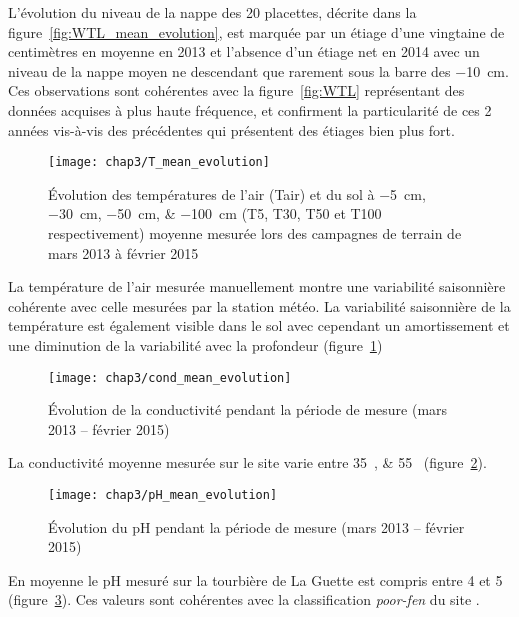 L'évolution du niveau de la nappe des 20 placettes, décrite dans la figure~\ref{fig:WTL_mean_evolution}, est marquée par un étiage d'une vingtaine de centimètres en moyenne en 2013 et l'absence d'un étiage net en 2014 avec un niveau de la nappe moyen ne descendant que rarement sous la barre des \SI{-10}{\cm}.
Ces observations sont cohérentes avec la figure~\ref{fig:WTL} représentant des données acquises à plus haute fréquence, et confirment la particularité de ces 2 années vis-à-vis des précédentes qui présentent des étiages bien plus fort.

\begin{figure}
\centering
\texttt{[image: chap3/T\_mean\_evolution]}
\caption{Évolution des températures de l'air (Tair) et du sol à \SIlist{-5;-30;-50;-100}{\centi\metre} (T5, T30, T50 et T100 respectivement) moyenne mesurée lors des campagnes de terrain de mars 2013 à février 2015}
\label{fig:T_mean_evolution}
\end{figure}

La température de l'air mesurée manuellement montre une variabilité saisonnière cohérente avec celle mesurées par la station météo. 
La variabilité saisonnière de la température est également visible dans le sol avec cependant un amortissement et une diminution de la variabilité avec la profondeur (figure~\ref{fig:T_mean_evolution})

\begin{figure}
\centering
\texttt{[image: chap3/cond\_mean\_evolution]}
\caption{Évolution de la conductivité pendant la période de mesure (mars 2013 -- février 2015)}
\label{fig:cond_mean_evolution}
\end{figure}

La conductivité moyenne mesurée sur le site varie entre \SIlist{35;55}{\usml} (figure~\ref{fig:cond_mean_evolution}).


\begin{figure}
\centering
\texttt{[image: chap3/pH\_mean\_evolution]}
\caption{Évolution du pH pendant la période de mesure (mars 2013 -- février 2015)}
\label{fig:pH_mean_evolution}
\end{figure}


En moyenne le pH mesuré sur la tourbière de La Guette est compris entre 4 et 5 (figure~\ref{fig:pH_mean_evolution}).
Ces valeurs sont cohérentes avec la classification \textit{poor-fen} du site .



